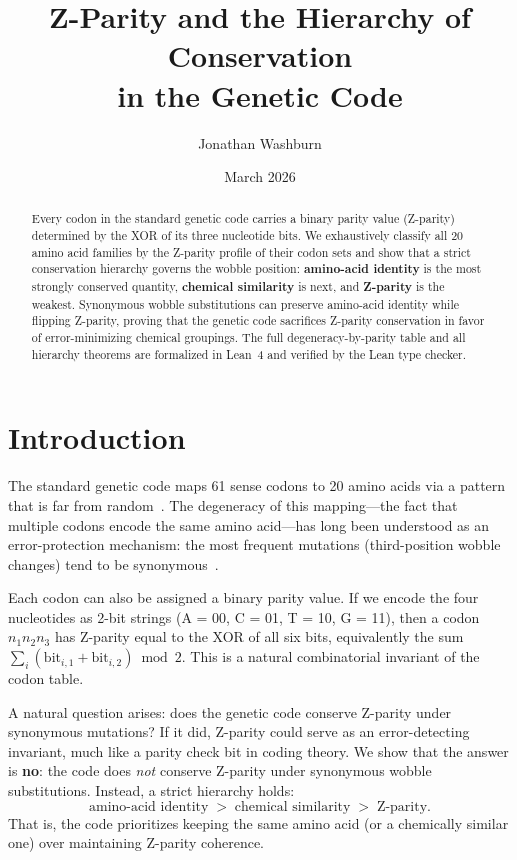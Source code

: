 \documentclass[11pt,twocolumn]{article}
\title{Z-Parity and the Hierarchy of Conservation\\in the Genetic Code}
\author[1]{Jonathan Washburn}
\affil[1]{Independent Researcher}
\date{March 2026}
\begin{document}
\maketitle

\begin{abstract}
Every codon in the standard genetic code carries a binary parity value
(Z-parity) determined by the XOR of its three nucleotide bits. We
exhaustively classify all 20 amino acid families by the Z-parity profile
of their codon sets and show that a strict conservation hierarchy governs
the wobble position: \textbf{amino-acid identity} is the most strongly
conserved quantity, \textbf{chemical similarity} is next, and
\textbf{Z-parity} is the weakest. Synonymous wobble substitutions can
preserve amino-acid identity while flipping Z-parity, proving that the
genetic code sacrifices Z-parity conservation in favor of
error-minimizing chemical groupings. The full degeneracy-by-parity table
and all hierarchy theorems are formalized in Lean~4 and verified by the
Lean type checker.
\end{abstract}

\section{Introduction}

The standard genetic code maps 61 sense codons to 20 amino acids via a
pattern that is far from random~\cite{Woese1965, Crick1968}. The
degeneracy of this mapping---the fact that multiple codons encode the
same amino acid---has long been understood as an error-protection
mechanism: the most frequent mutations (third-position wobble changes)
tend to be synonymous~\cite{Woese1966}.

Each codon can also be assigned a binary parity value. If we encode the
four nucleotides as 2-bit strings (A = 00, C = 01, T = 10, G = 11), then
a codon $n_1 n_2 n_3$ has Z-parity equal to the XOR of all six bits,
equivalently the sum $\sum_i (\text{bit}_{i,1} + \text{bit}_{i,2})
\bmod 2$. This is a natural combinatorial invariant of the codon table.

A natural question arises: does the genetic code conserve Z-parity under
synonymous mutations? If it did, Z-parity could serve as an
error-detecting invariant, much like a parity check bit in coding theory.
We show that the answer is \textbf{no}: the code does \emph{not} conserve
Z-parity under synonymous wobble substitutions. Instead, a strict
hierarchy holds:
\begin{equation}\label{eq:hierarchy}
  \text{amino-acid identity} \;>\; \text{chemical similarity} \;>\; \text{Z-parity}.
\end{equation}
That is, the code prioritizes keeping the same amino acid (or a chemically
similar one) over maintaining Z-parity coherence.
\end{document}

